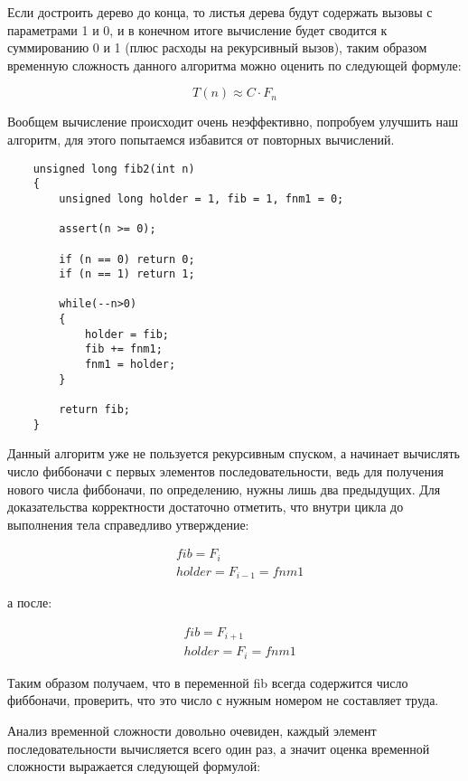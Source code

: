 Если достроить дерево до конца, то листья дерева будут содержать вызовы с параметрами 1 и 0, и в конечном итоге вычисление будет сводится к суммированию 0 и 1 (плюс расходы на рекурсивный вызов), таким образом временную сложность данного алгоритма можно оценить по следующей формуле:

\begin{equation}
	T \left ( n \right ) \approx C \cdot F _n
\end{equation}

Вообщем вычисление происходит очень неэффективно, попробуем улучшить наш алгоритм, для этого попытаемся избавится от повторных вычислений.

\begin{lstlisting}
	unsigned long fib2(int n)
	{
		unsigned long holder = 1, fib = 1, fnm1 = 0;

		assert(n >= 0);

		if (n == 0) return 0;
		if (n == 1) return 1;

		while(--n>0)
		{
			holder = fib;
			fib += fnm1;
			fnm1 = holder;
		}

		return fib;
	}
\end{lstlisting}

Данный алгоритм уже не пользуется рекурсивным спуском, а начинает вычислять число фиббоначи с первых элементов последовательности, ведь для получения нового числа фиббоначи, по определению, нужны лишь два предыдущих. Для доказательства корректности достаточно отметить, что внутри цикла до выполнения тела справедливо утверждение:

\begin{equation}
	\begin{split}
		& fib = F _i \\
		& holder = F _{i-1} = fnm1
	\end{split}
\end{equation}

а после:

\begin{equation}
	\begin{split}
		& fib = F _{i+1} \\
		& holder = F _i = fnm1
	\end{split}
\end{equation}

Таким образом получаем, что в переменной fib всегда содержится число фиббоначи, проверить, что это число с нужным номером не составляет труда.

Анализ временной сложности довольно очевиден, каждый элемент последовательности вычисляется всего один раз, а значит оценка временной сложности выражается следующей формулой:

